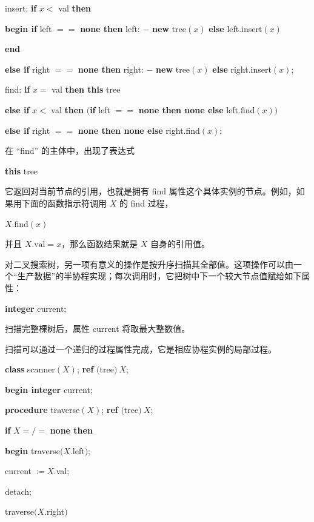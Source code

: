 \documentclass[twoside,11pt,fontset=none]{ctexbook}
\begin{document}
\quad insert: \textbf{if} $x <$ val \textbf{then}

\quad \quad \textbf{begin if} left $==$ \textbf{none then} left: $-$ \textbf{new} tree$(x)$ \textbf{else} left.insert$(x)$

\quad \quad \textbf{end}

\quad \textbf{else if} right $==$ \textbf{none then} right: $-$ \textbf{new} tree$(x)$ \textbf{else} right.insert$(x)$;
\smallskip

\quad find: \textbf{if} $x =$ val \textbf{then this} tree

\quad \textbf{else if} $x <$ val \textbf{then} $($\textbf{if} left $==$ \textbf{none then none else} left.find$(x))$

\quad \textbf{else if} right $==$ \textbf{none then none else} right.find$(x);$

\noindent
在 ``find'' 的主体中，出现了表达式

\quad \textbf{this} tree

\noindent
它返回对当前节点的引用，也就是拥有 find 属性这个具体实例的节点。例如，如果用下面的函数指示符调用 $X$ 的 find 过程，

\quad $X.$find$(x)$

\noindent
并且 $X.\text{val} = x$，那么函数结果就是 $X$ 自身的引用值。

对二叉搜索树，另一项有意义的操作是按升序扫描其全部值。这项操作可以由一个“生产数据”的半协程实现；每次调用时，它把树中下一个较大节点值赋给如下属性：

\quad \textbf{integer} current;

\noindent
扫描完整棵树后，属性 current 将取最大整数值。

扫描可以通过一个递归的过程属性完成，它是相应协程实例的局部过程。

\quad \textbf{class} scanner$(X)$; \textbf{ref} $($tree$)\ X$;

\quad \quad \textbf{begin integer} current;

\quad \quad \quad \textbf{procedure} traverse$(X)$; \textbf{ref} $($tree$)\ X$;

\quad \quad \quad \quad \textbf{if} $X =/=$ \textbf{none then}

\quad \quad \quad \quad \quad \textbf{begin} traverse$(X$.left$)$;

\quad \quad \quad \quad \quad \quad current $\coloneq X$.val;

\quad \quad \quad \quad \quad \quad detach;

\quad \quad \quad \quad \quad \quad traverse$(X$.right$)$
\end{document}
